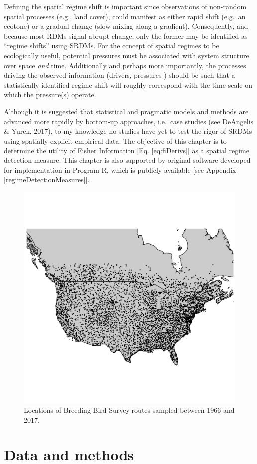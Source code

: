 \documentclass[12pt,twoside,openany]{reedthesis}
\begin{document}
Defining the spatial regime shift is important since observations of non-random spatial processes (e.g., land cover), could manifest as either rapid shift (e.g.~an ecotone) or a gradual change (slow mixing along a gradient). Consequently, and because most RDMs signal abrupt change, only the former may be identified as ``regime shifts'' using SRDMs. For the concept of spatial regimes to be ecologically useful, potential pressures must be associated with system structure over space \emph{and} time. Additionally and perhaps more importantly, the processes driving the observed information (drivers, pressures ) should be such that a statistically identified regime shift will roughly correspond with the time scale on which the pressure(s) operate.

Although it is suggested that statistical and pragmatic models and methods are advanced more rapidly by bottom-up approaches, i.e.~case studies (see DeAngelis \& Yurek, 2017), to my knowledge no studies have yet to test the rigor of SRDMs using spatially-explicit empirical data. The objective of this chapter is to determine the utility of Fisher Information {[}Eq. \eqref{eq:fiDerivs}{]} as a spatial regime detection measure. This chapter is also supported by original software developed for implementation in Program R, which is publicly available {[}see Appendix \ref{regimeDetectionMeasures}{]}.
\begin{figure}
\includegraphics[width=29.17in]{./chapterFiles/fisherSpatial/figures/figsCalledInDiss/bbsRoutesUsed} \caption{Locations of Breeding Bird Survey routes sampled between 1966 and 2017.}\label{fig:bbsPoints}
\end{figure}
\hypertarget{data-and-methods}{%
\section{Data and methods}\label{data-and-methods}}
\end{document}
